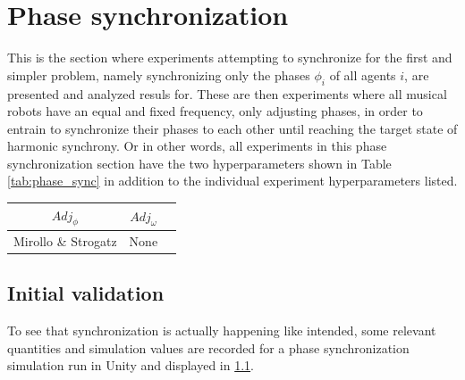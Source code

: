 	

\section{Phase synchronization}
\label{sec:phase_sync}
This is the section where experiments attempting to synchronize for the first and simpler problem, namely synchronizing only the phases $\phi_i$ of all agents $i$, are presented and analyzed resuls for. These are then experiments where all musical robots have an equal and fixed frequency, only adjusting phases, in order to entrain to synchronize their phases to each other until reaching the target state of harmonic synchrony. Or in other words, all experiments in this phase synchronization section have the two hyperparameters shown in Table \ref{tab:phase_sync} in addition to the individual experiment hyperparameters listed.

\begin{center}
\begin{tabular}{ |c|c|c| } 
\hline
$Adj_\phi$ & $Adj_\omega$ \\
\hline
Mirollo \& Strogatz & None  \\
\hline
\end{tabular}
\label{tab:phase_sync}
\end{center}

	\subsection{Initial validation}
	
	To see that synchronization is actually happening like intended, some relevant quantities and simulation values are recorded for a phase synchronization simulation run in Unity and displayed in \ref{}.
	
